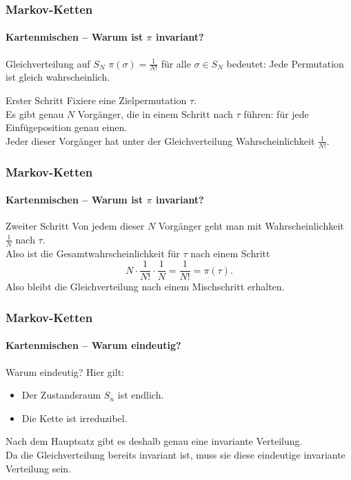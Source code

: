 \documentclass{beamer}
\begin{document}
\begin{frame}
    \frametitle{Markov-Ketten}
\framesubtitle{Kartenmischen -- Warum ist $\pi$ invariant?}
    \begin{block}{Gleichverteilung auf $S_N$}
$\pi(\sigma)=\frac{1}{N!}$ für alle $\sigma \in S_N$ bedeutet: Jede Permutation ist gleich wahrscheinlich.
\end{block}
\begin{block}{Erster Schritt}
Fixiere eine Zielpermutation $\tau$.\\
Es gibt genau $N$ Vorgänger, die in einem Schritt nach $\tau$ führen: für jede Einfügeposition genau einen.\\
Jeder dieser Vorgänger hat unter der Gleichverteilung Wahrscheinlichkeit $\frac{1}{N!}$.
\end{block}
 \end{frame}


\begin{frame}
    \frametitle{Markov-Ketten}
\framesubtitle{Kartenmischen -- Warum ist $\pi$ invariant?}
\begin{block}{Zweiter Schritt}
Von jedem dieser $N$ Vorgänger geht man mit Wahrscheinlichkeit $\frac{1}{N}$ nach $\tau$.\\
Also ist die Gesamtwahrscheinlichkeit für $\tau$ nach einem Schritt
\[
N \cdot \frac{1}{N!}\cdot \frac{1}{N} = \frac{1}{N!} = \pi(\tau).
\]
Also bleibt die Gleichverteilung nach einem Mischschritt erhalten.
\end{block}
 \end{frame}


\begin{frame}
    \frametitle{Markov-Ketten}
\framesubtitle{Kartenmischen -- Warum eindeutig?}
\begin{block}{Warum eindeutig?}
Hier gilt:
\begin{itemize}
\item Der Zustandsraum $S_n$ ist endlich.
\item Die Kette ist irreduzibel.
\end{itemize}
Nach dem Hauptsatz gibt es deshalb genau eine invariante Verteilung.\\
Da die Gleichverteilung bereits invariant ist, muss sie diese eindeutige invariante Verteilung sein.
\end{block}
 \end{frame}
\end{document}
